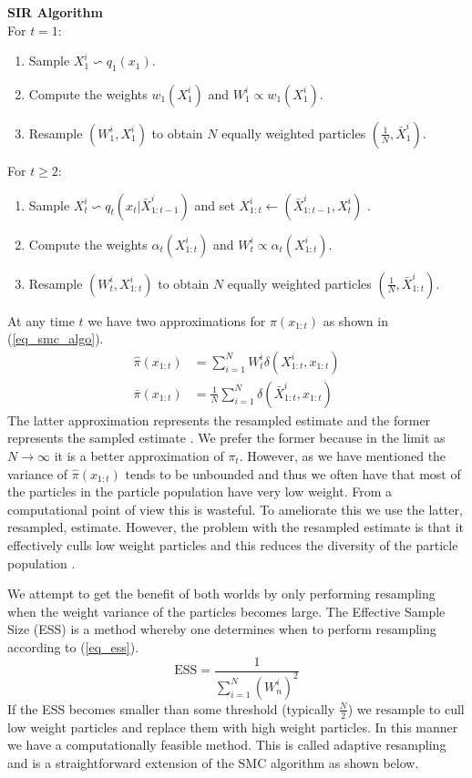 \documentclass[../masters.tex]{subfiles}
\begin{document}
\textbf{SIR Algorithm} \\
For $t=1$:
\begin{enumerate}
\item
Sample $X^i_1 \backsim q_1(x_1)$.
\item
Compute the weights $w_1(X_1^i)$ and $W^i_1 \propto w_1(X^i_1)$.
\item
Resample $(W^i_1, X^i_1)$ to obtain $N$ equally weighted particles $(\frac{1}{N}, \bar{X}^i_1)$.
\end{enumerate}
For $t \geq 2$:
\begin{enumerate}
\item
Sample $X^i_t \backsim q_t(x_t|\bar{X}^i_{1:t-1})$ and set ${X}^i_{1:t} \leftarrow (\bar{X}^i_{1:t-1}, X^i_t)$ .
\item
Compute the weights $\alpha_t(X^i_{1:t})$ and $W^i_t \propto \alpha_t(X^i_{1:t})$.
\item
Resample $(W^i_t, X^i_{1:t})$ to obtain $N$ equally weighted particles $(\frac{1}{N}, \bar{X}^i_{1:t})$.
\end{enumerate}
At any time $t$ we have two approximations for $\pi(x_{1:t})$ as shown in (\ref{eq_smc_algo}).
\begin{equation}
\begin{aligned}
\hat{\pi}(x_{1:t}) &= \sum_{i=1}^N W^i_t \delta(X^i_{1:t}, x_{1:t}) \\
\bar{\pi}(x_{1:t}) &= \frac{1}{N}\sum_{i=1}^N \delta(\bar{X}^i_{1:t}, x_{1:t})
\end{aligned}
\label{eq_smc_algo}
\end{equation}
The latter approximation represents the resampled estimate and the former represents the sampled estimate \cite{pftut}. We prefer the former because in the limit as $N \rightarrow \infty$ it is a better approximation of $\pi_t$. However, as we have mentioned the variance of $\hat{\pi}(x_{1:t})$ tends to be unbounded and thus we often have that most of the particles in the particle population have very low weight. From a computational point of view this is wasteful. To ameliorate this we use the latter, resampled, estimate. However, the problem with the resampled estimate is that it effectively culls low weight particles and this reduces the diversity of the particle population \cite{murphy1}. 

We attempt to get the benefit of both worlds by only performing resampling when the weight variance of the particles becomes large. The Effective Sample Size (ESS) is a method whereby one determines when to perform resampling according to (\ref{eq_ess}).
\begin{equation}
\text{ESS} = \frac{1}{\sum_{i=1}^N (W^i_n)^2}
\label{eq_ess}
\end{equation} 
If the ESS becomes smaller than some threshold (typically $\frac{N}{2}$) we resample to cull low weight particles and replace them with high weight particles. In this manner we have a computationally feasible method. This is called adaptive resampling and is a straightforward extension of the SMC algorithm as shown below.
\end{document}
